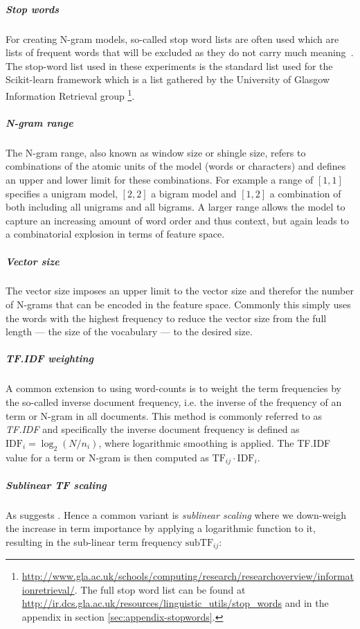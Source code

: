 \subparagraph{Stop words}
\label{subp:Stop words}
For creating N-gram models, so-called stop word lists are often used which are lists of frequent words that will be excluded as they do not carry much meaning~\cite[Chapter 1.3.1, p.~7]{Leskovec:2014aa}. The stop-word list used in these experiments is the standard list used for the Scikit-learn framework \cite{Pedregosa:2011aa} which is a list gathered by the University of Glasgow Information Retrieval group \footnote{\url{http://www.gla.ac.uk/schools/computing/research/researchoverview/informationretrieval/}. The full stop word list can be found at \url{http://ir.dcs.gla.ac.uk/resources/linguistic_utils/stop_words} and in the appendix in section \ref{sec:appendix-stopwords}.}.

\subparagraph{N-gram range} The N-gram range, also known as window size or shingle size, refers to combinations of the atomic units of the model (words or characters) and defines an upper and lower limit for these combinations. For example a range of $[1,1]$ specifies a unigram model, $[2,2]$ a bigram model and $[1,2]$ a combination of both including all unigrams and all bigrams.
A larger range allows the model to capture an increasing amount of word order and thus context, but again leads to a combinatorial explosion in terms of feature space.

\subparagraph{Vector size} The vector size imposes an upper limit to the vector size and therefor the number of N-grams that can be encoded in the feature space. Commonly this simply uses the words with the highest frequency to reduce the vector size from the full length --- the size of the vocabulary --- to the desired size.

\subparagraph{TF.IDF weighting}
\label{subp:TF.IDF weighting}
A common extension to using word-counts is to weight the term frequencies by the so-called inverse document frequency, i.e. the inverse of the frequency of an term or N-gram in all documents. This method is commonly referred to as \emph{TF.IDF} and specifically the inverse document frequency is defined as $\text{IDF}_i = \log_2 (N/n_i)$, where logarithmic smoothing is applied. The TF.IDF value for a term or N-gram is then computed as $\text{TF}_{ij} \cdot \text{IDF}_i$.

\subparagraph{Sublinear TF scaling}
\label{subp:Sublinear TF scaling}
 As \cite[Chapter 6.4.1, p.~126]{Manning:2008aa} suggests . Hence a common variant is \emph{sublinear scaling} where we down-weigh the increase in term importance by applying a logarithmic function to it, resulting in the sub-linear term frequency $\text{subTF}_{ij}$:

